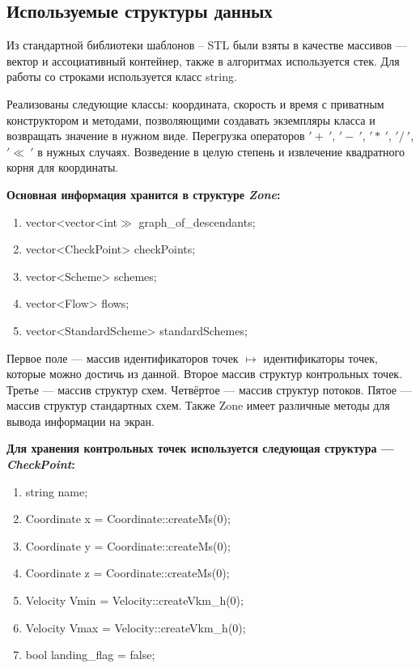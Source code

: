\documentclass[12pt, a4 paper]{article}
\theoremstyle{plain}
\begin{document}
\newpage


\subsection{Используемые структуры данных}

Из стандартной библиотеки шаблонов – STL были взяты в качестве массивов --- вектор и ассоциативный контейнер, также в алгоритмах используется стек. Для работы со строками используется класс string.

Реализованы следующие классы: координата, скорость и время с приватным конструктором и методами, позволяющими создавать экземпляры класса и возвращать значение в нужном виде. Перегрузка операторов $ '+~'$, $'-~'$, $'\ast~'$, $'/~'$, $'\ll~'$ в нужных случаях. Возведение в целую степень и извлечение квадратного корня для координаты.

\textbf{Основная информация хранится в структуре \textit{Zone}:}
\begin{enumerate}
	\item vector<vector<int$\gg$ graph\_of\_descendants;
	\item vector<CheckPoint> checkPoints;
	\item vector<Scheme> schemes;
	\item vector<Flow> flows;
	\item vector<StandardScheme> standardSchemes;
\end{enumerate}


Первое поле --- массив идентификаторов точек $\mapsto$ идентификаторы точек, которые можно достичь из данной. Второе массив структур контрольных точек. Третье --- массив структур схем. Четвёртое --- массив структур потоков. Пятое --- массив структур стандартных схем. Также Zone имеет различные методы для вывода информации на экран.


\textbf{Для хранения контрольных точек используется следующая структура --- \textit{CheckPoint}:}

\begin{enumerate}
	\item string name;
	\item Coordinate x = Coordinate::createMs(0);
	\item Coordinate y = Coordinate::createMs(0);
	\item Coordinate z = Coordinate::createMs(0);
	\item Velocity Vmin = Velocity::createVkm\_h(0);
	\item Velocity Vmax = Velocity::createVkm\_h(0);
	\item bool landing\_flag = false;
\end{enumerate}
\end{document}
